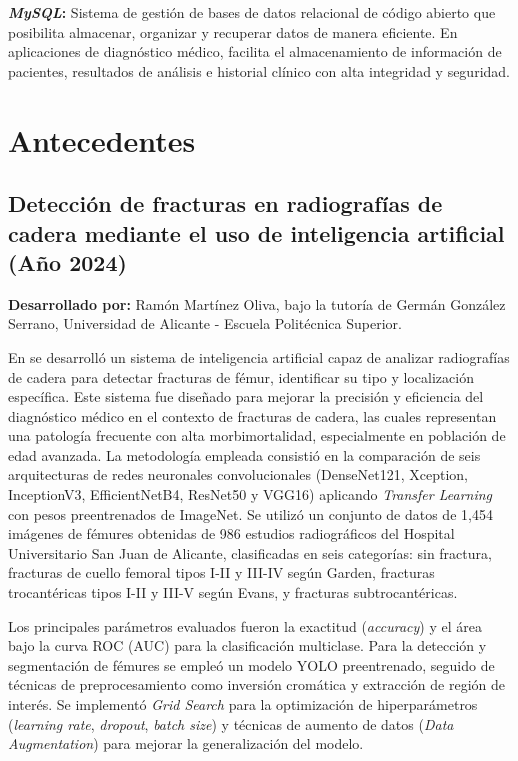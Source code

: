{\textbf{\textit{MySQL}:} Sistema de gestión de bases de datos relacional de código abierto que posibilita almacenar, organizar y recuperar datos de manera eficiente. En aplicaciones de diagnóstico médico, facilita el almacenamiento de información de pacientes, resultados de análisis e historial clínico con alta integridad y seguridad.

\section{Antecedentes}

\subsection{Detección de fracturas en radiografías de cadera mediante el uso de inteligencia artificial (Año 2024)}

\textbf{Desarrollado por:} Ramón Martínez Oliva, bajo la tutoría de Germán González Serrano, Universidad de Alicante - Escuela Politécnica Superior.

En \cite{llorens2023} se desarrolló un sistema de inteligencia artificial capaz de analizar radiografías de cadera para detectar fracturas de fémur, identificar su tipo y localización específica. Este sistema fue diseñado para mejorar la precisión y eficiencia del diagnóstico médico en el contexto de fracturas de cadera, las cuales representan una patología frecuente con alta morbimortalidad, especialmente en población de edad avanzada. La metodología empleada consistió en la comparación de seis arquitecturas de redes neuronales convolucionales (DenseNet121, Xception, InceptionV3, EfficientNetB4, ResNet50 y VGG16) aplicando \textit{Transfer Learning} con pesos preentrenados de ImageNet. Se utilizó un conjunto de datos de 1,454 imágenes de fémures obtenidas de 986 estudios radiográficos del Hospital Universitario San Juan de Alicante, clasificadas en seis categorías: sin fractura, fracturas de cuello femoral tipos I-II y III-IV según Garden, fracturas trocantéricas tipos I-II y III-V según Evans, y fracturas subtrocantéricas.

Los principales parámetros evaluados fueron la exactitud (\textit{accuracy}) y el área bajo la curva ROC (AUC) para la clasificación multiclase. Para la detección y segmentación de fémures se empleó un modelo YOLO preentrenado, seguido de técnicas de preprocesamiento como inversión cromática y extracción de región de interés. Se implementó \textit{Grid Search} para la optimización de hiperparámetros (\textit{learning rate}, \textit{dropout}, \textit{batch size}) y técnicas de aumento de datos (\textit{Data Augmentation}) para mejorar la generalización del modelo.

}
